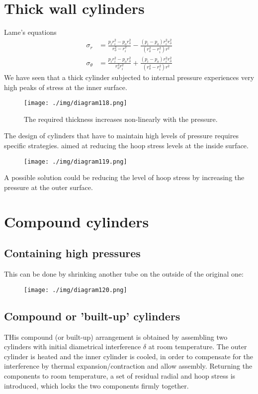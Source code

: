 \section{Thick wall cylinders}
Lame's equations
\begin{align}
    \sigma_r        & = \frac{p_i r_i^2 - p_or_o^2}{r_o^2 - r_i^2} - \frac{\left(p_i-p_o\right)r_i^2 r_o^2}{\left(r_o^2 - r_i^2\right)r^2} \\
    \sigma_{\theta} & = \frac{p_i r_i^2 - p_o r_o^2}{r_o^2 r_i^2} + \frac{\left(p_i-p_o\right)r_i^2 r_o^2}{\left(r_o^2 - r_i^2\right)r^2}
\end{align}
We have seen that a thick cylinder subjected to internal pressure experiences very high peaks of stress at the inner surface.
\begin{figure}[H]
    \centering
    \texttt{[image: ./img/diagram118.png]}
    \caption{The required thickness increases non-linearly with the pressure.}
\end{figure}
The design of cylinders that have to maintain high levels of pressure requires specific strategies. aimed at reducing the hoop stress levels at the inside surface.
\begin{figure}[H]
    \centering
    \texttt{[image: ./img/diagram119.png]}
    \caption{}
\end{figure}
A possible solution could be reducing the level of hoop stress by increasing the pressure at the outer surface.
\section{Compound cylinders}
\subsection{Containing high pressures}
This can be done by shrinking another tube on the outside of the original one:
\begin{figure}[H]
    \centering
    \texttt{[image: ./img/diagram120.png]}
    \caption{}
\end{figure}
\subsection{Compound or 'built-up' cylinders}
THis compound (or built-up) arrangement is obtained by assembling two cylinders with initial diametrical interference $\delta$ at room temperature. The outer cylinder is heated and the inner cylinder is cooled, in order to compensate for the interference by thermal expansion/contraction and allow assembly. Returning the components to room temperature, a set of residual radial and hoop stress is introduced, which locks the two components firmly together.

